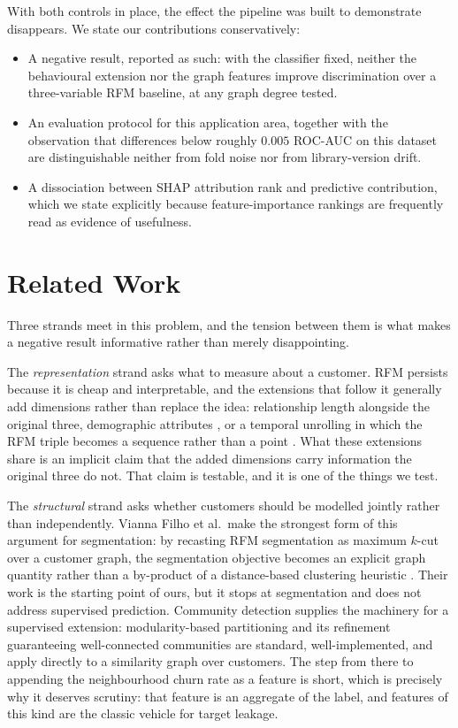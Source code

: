\documentclass[runningheads]{llncs}
\begin{document}
With both controls in place, the effect the pipeline was built to demonstrate
disappears. We state our contributions conservatively:

\begin{itemize}
\item A negative result, reported as such: with the classifier fixed, neither
the behavioural extension nor the graph features improve discrimination over a
three-variable RFM baseline, at any graph degree tested.
\item An evaluation protocol for this application area, together with the
observation that differences below roughly $0.005$ ROC-AUC on this dataset are
distinguishable neither from fold noise nor from library-version drift.
\item A dissociation between SHAP attribution rank and predictive contribution,
which we state explicitly because feature-importance rankings are frequently read
as evidence of usefulness.
\end{itemize}

\section{Related Work}

Three strands meet in this problem, and the tension between them is what makes a
negative result informative rather than merely disappointing.

The \emph{representation} strand asks what to measure about a customer. RFM
persists because it is cheap and interpretable, and the extensions that follow it
generally add dimensions rather than replace the idea: relationship length
alongside the original three, demographic attributes \cite{ho2023extended}, or a
temporal unrolling in which the RFM triple becomes a sequence rather than a point
\cite{mena2023timevarying}. What these extensions share is an implicit claim that
the added dimensions carry information the original three do not. That claim is
testable, and it is one of the things we test.

The \emph{structural} strand asks whether customers should be modelled jointly
rather than independently. Vianna Filho et al.\ make the strongest form of this
argument for segmentation: by recasting RFM segmentation as maximum $k$-cut over
a customer graph, the segmentation objective becomes an explicit graph quantity
rather than a by-product of a distance-based clustering heuristic
\cite{viannafilho2026rfm}. Their work is the starting point of ours, but it stops
at segmentation and does not address supervised prediction. Community detection
supplies the machinery for a supervised extension: modularity-based partitioning
\cite{newman2004community,blondel2008louvain} and its refinement guaranteeing
well-connected communities \cite{traag2019leiden} are standard, well-implemented,
and apply directly to a similarity graph over customers. The step from there to
appending the neighbourhood churn rate as a feature is short, which is precisely
why it deserves scrutiny: that feature is an aggregate of the label, and features
of this kind are the classic vehicle for target leakage.
\end{document}
